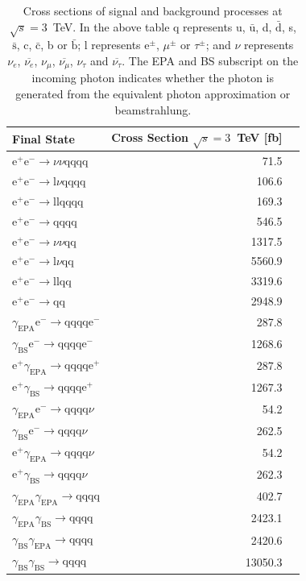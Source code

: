 \begin{table}[h!]
\centering
\begin{tabular}{ l r r }
\hline
Final State & Cross Section $\sqrt{s}=3$~TeV [fb]  \\ 
\hline
$\text{e}^{+}\text{e}^{-} \rightarrow \nu{\nu}\text{qqqq}$ & 71.5 \\
$\text{e}^{+}\text{e}^{-} \rightarrow \text{l}\nu\text{qqqq}$ & 106.6 \\
$\text{e}^{+}\text{e}^{-} \rightarrow \text{llqqqq}$ & 169.3 \\
$\text{e}^{+}\text{e}^{-} \rightarrow \text{qqqq}$ & 546.5 \\
$\text{e}^{+}\text{e}^{-} \rightarrow \nu{\nu}\text{qq}$ & 1317.5 \\
$\text{e}^{+}\text{e}^{-} \rightarrow \text{l}\nu\text{qq}$ & 5560.9 \\
$\text{e}^{+}\text{e}^{-} \rightarrow \text{llqq}$ & 3319.6 \\
$\text{e}^{+}\text{e}^{-} \rightarrow \text{qq}$ & 2948.9 \\
$\gamma_{\text{EPA}}\text{e}^{-} \rightarrow \text{qqqq}\text{e}^{-}$ & 287.8 \\
$\gamma_{\text{BS}}\text{e}^{-} \rightarrow \text{qqqq}\text{e}^{-}$ & 1268.6 \\
$\text{e}^{+}\gamma_{\text{EPA}} \rightarrow \text{qqqq}\text{e}^{+}$ & 287.8 \\
$\text{e}^{+}\gamma_{\text{BS}} \rightarrow \text{qqqq}\text{e}^{+}$ & 1267.3 \\
$\gamma_{\text{EPA}}\text{e}^{-} \rightarrow \text{qqqq}\nu$ & 54.2 \\
$\gamma_{\text{BS}}\text{e}^{-} \rightarrow \text{qqqq}\nu$ & 262.5 \\
$\text{e}^{+}\gamma_{\text{EPA}} \rightarrow \text{qqqq}\nu$ & 54.2 \\
$\text{e}^{+}\gamma_{\text{BS}} \rightarrow \text{qqqq}\nu$ & 262.3 \\
$\gamma_{\text{EPA}}\gamma_{\text{EPA}} \rightarrow \text{qqqq}$ & 402.7 \\
$\gamma_{\text{EPA}}\gamma_{\text{BS}} \rightarrow \text{qqqq}$ & 2423.1 \\
$\gamma_{\text{BS}}\gamma_{\text{EPA}} \rightarrow \text{qqqq}$ & 2420.6 \\
$\gamma_{\text{BS}}\gamma_{\text{BS}} \rightarrow \text{qqqq}$ & 13050.3 \\
\hline
\end{tabular}
\caption[Cross sections of signal and background processes at $\sqrt{s}=3$~TeV]{Cross sections of signal and background processes at $\sqrt{s}=3$~TeV.  In the above table q represents u, $\bar{\text{u}}$, d, $\bar{\text{d}}$, s, $\bar{\text{s}}$, c, $\bar{\text{c}}$, b or $\bar{\text{b}}$;  l represents $\text{e}^{\pm}$, $\mu^{\pm}$ or $\tau^{\pm}$; and $\nu$ represents $\nu_{e}$, $\overline{\nu_{e}}$, $\nu_{\mu}$, $\overline{\nu_{\mu}}$, $\nu_{\tau}$ and $\overline{\nu_{\tau}}$.  The EPA and BS subscript on the incoming photon indicates whether the photon is generated from the equivalent photon approximation or beamstrahlung.}
\label{table:crosssection3000GeV}
\end{table}

